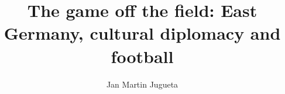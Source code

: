 \documentclass[logo]{style/usydthesis}
\begin{document}
\renewcommand{\thepage}{\roman{page}}	
\title{{\bf\Huge The game off the field: East Germany, cultural diplomacy and football}}
\author{Jan Martin Jugueta}

\maketitle
{}





\setcounter{tocdepth}{2}
\newpage
{}
\tableofcontents
\listoffigures


\setcounter{page}{1}
\setcounter{chapter}{0}

\renewcommand{\thepage}{\arabic{page}}	
\setupParagraphs








%
%
\printbibliography

\appendix

\end{document}
